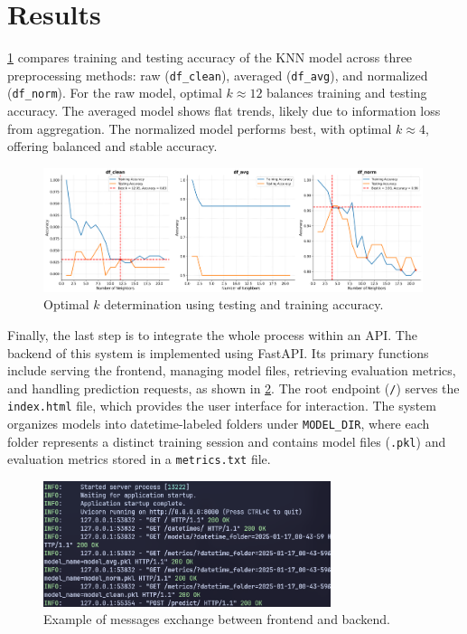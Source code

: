 \section{Results}

\cref{fig:fig3} compares training and testing accuracy of the KNN model across
three preprocessing methods: raw (\texttt{df\_clean}), averaged
(\texttt{df\_avg}), and normalized (\texttt{df\_norm}). For the raw model,
optimal \(k \approx 12\) balances training and testing accuracy. The averaged
model shows flat trends, likely due to information loss from aggregation. The
normalized model performs best, with optimal \(k \approx 4\), offering balanced
and stable accuracy.

\begin{figure}[H]
	\centering
	\includegraphics[width=0.99\textwidth]{../images/feature_selection/best_k.png}
	\caption{Optimal \(k\) determination using testing and training accuracy.}
	\label{fig:fig3}
\end{figure}

Finally, the last step is to integrate the whole process within an API. The
backend of this system is implemented using FastAPI. Its primary functions
include serving the frontend, managing model files, retrieving evaluation
metrics, and handling prediction requests, as shown in \cref{fig:fig4}. The
root endpoint (\texttt{/}) serves the \texttt{index.html} file, which provides
the user interface for interaction. The system organizes models into
datetime-labeled folders under \texttt{MODEL\_DIR}, where each folder
represents a distinct training session and contains model files (\texttt{.pkl})
and evaluation metrics stored in a \texttt{metrics.txt} file.

\begin{figure}[H]
	\centering
	\includegraphics[width=0.75\textwidth,
		height=0.2\textheight]{../images/api/backend.png}
	\caption{Example of messages exchange between frontend and backend.}
	\label{fig:fig4}
\end{figure}


